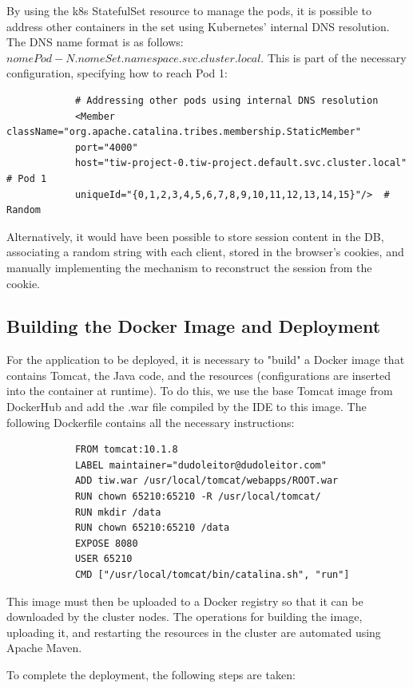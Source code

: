 \documentclass[12pt, a4paper, renqo, final]{amsart}
\begin{document}
		By using the k8s StatefulSet resource to manage the pods, it is possible to address other containers in the set using Kubernetes' internal DNS resolution. The DNS name format is as follows: $nomePod-N.nomeSet.namespace.svc.cluster.local$. This is part of the necessary configuration, specifying how to reach Pod 1:

		\begin{lstlisting}
		    # Addressing other pods using internal DNS resolution
		    <Member className="org.apache.catalina.tribes.membership.StaticMember"
		    port="4000"					
		    host="tiw-project-0.tiw-project.default.svc.cluster.local"  # Pod 1			
		    uniqueId="{0,1,2,3,4,5,6,7,8,9,10,11,12,13,14,15}"/>  # Random
		\end{lstlisting}

		Alternatively, it would have been possible to store session content in the DB, associating a random string with each client, stored in the browser's cookies, and manually implementing the mechanism to reconstruct the session from the cookie.

		\subsection{Building the Docker Image and Deployment}
		For the application to be deployed, it is necessary to "build" a Docker image that contains Tomcat, the Java code, and the resources (configurations are inserted into the container at runtime). To do this, we use the base Tomcat image from DockerHub and add the .war file compiled by the IDE to this image. The following Dockerfile contains all the necessary instructions:

		\begin{lstlisting}
		    FROM tomcat:10.1.8
		    LABEL maintainer="dudoleitor@dudoleitor.com"
		    ADD tiw.war /usr/local/tomcat/webapps/ROOT.war
		    RUN chown 65210:65210 -R /usr/local/tomcat/
		    RUN mkdir /data
		    RUN chown 65210:65210 /data
		    EXPOSE 8080
		    USER 65210
		    CMD ["/usr/local/tomcat/bin/catalina.sh", "run"]
		\end{lstlisting}

		This image must then be uploaded to a Docker registry so that it can be downloaded by the cluster nodes. The operations for building the image, uploading it, and restarting the resources in the cluster are automated using Apache Maven.

		To complete the deployment, the following steps are taken:
\end{document}
